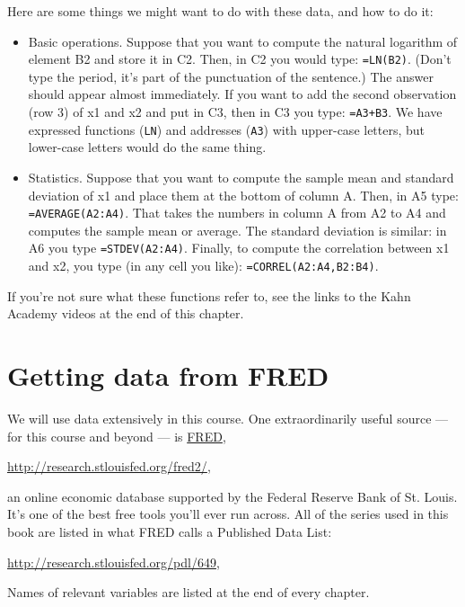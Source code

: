 Here are some things we might want to do with these data,
and how to do it:
\begin{itemize}
\item Basic operations.  Suppose that you want to compute the natural
logarithm of element B2 and store it in C2.
Then, in C2 you would type:  {\tt =LN(B2)}.
(Don't type the period, it's part of the punctuation of the sentence.)
The answer should appear almost immediately.
If you want to add the second observation (row 3) of x1 and x2
and put in C3, then in C3 you type:
{\tt =A3+B3}.
We have expressed functions ({\tt LN}) and addresses ({\tt A3}) with upper-case
letters, but lower-case letters would do the same thing.

\item Statistics.
Suppose that you want to compute the sample mean and standard deviation of
x1 and place them at the bottom of column A.
Then, in A5 type: {\tt =AVERAGE(A2:A4)}.
That takes the numbers in column A from A2 to A4 and computes the sample
mean or average.
The standard deviation is similar:  in A6 you type {\tt =STDEV(A2:A4)}.
Finally, to compute the correlation between x1 and x2,
you type (in any cell you like):
{\tt =CORREL(A2:A4,B2:B4)}.

\end{itemize}
If you're not sure what these functions refer to,
see the links to the Kahn Academy videos at the end of this chapter.


\section{Getting data from FRED}

We will use data extensively in this course.
One extraordinarily useful source --- for this course and beyond ---
is \href{http://research.stlouisfed.org/fred2}{FRED},

\vspace*{\parskip}
\centerline{\url{http://research.stlouisfed.org/fred2/},}

an online economic database supported by the Federal Reserve Bank of St. Louis.
It's one of the best free tools you'll ever run across.
All of the series used in this book are listed in what FRED calls
a Published Data List:

\vspace*{\parskip}
\centerline{\url{http://research.stlouisfed.org/pdl/649},}

Names of relevant variables are listed at the end of every chapter.

